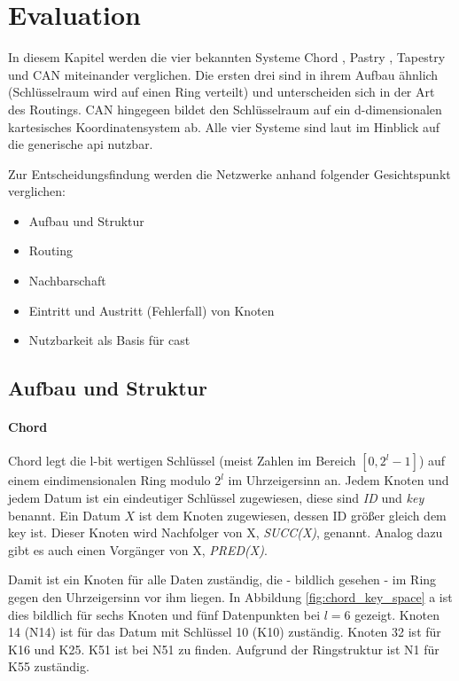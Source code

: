 


\section{Evaluation}
In diesem Kapitel werden die vier bekannten Systeme Chord \cite{Stoica2003}, Pastry \cite{Rowstron2001}, Tapestry \cite{Zhao2001Tapestry,Zhao2004Tapestry} und CAN \cite{Ratnasamy2001Scalable} miteinander verglichen. Die ersten drei sind in ihrem Aufbau ähnlich (Schlüsselraum wird auf einen Ring verteilt) und unterscheiden sich in der Art des Routings. CAN hingegeen bildet den Schlüsselraum auf ein d-dimensionalen kartesisches Koordinatensystem ab. Alle vier Systeme sind laut \cite{Dabek2003Towards} im Hinblick auf die generische \ac{api} nutzbar.

Zur Entscheidungsfindung werden die Netzwerke anhand folgender Gesichtspunkt verglichen:
\begin{itemize}
\item Aufbau und Struktur
\item Routing
\item Nachbarschaft
\item Eintritt und Austritt (Fehlerfall) von Knoten
\item Nutzbarkeit als Basis für \ac{cast}
\end{itemize}

\subsection{Aufbau und Struktur}
\paragraph{Chord}
Chord \cite{Stoica2003} legt die l-bit wertigen Schlüssel (meist Zahlen im Bereich $[0,2^l-1]$) auf einem eindimensionalen Ring modulo $2^l$ im Uhrzeigersinn an. Jedem Knoten und jedem Datum ist ein eindeutiger Schlüssel zugewiesen, diese sind \emph{ID} und \emph{key} benannt. Ein Datum $X$ ist dem Knoten zugewiesen, dessen ID größer gleich dem key ist. Dieser Knoten wird Nachfolger von X, \emph{SUCC(X)}, genannt. Analog dazu gibt es auch einen Vorgänger von X, \emph{PRED(X)}.

Damit ist ein Knoten für alle Daten zuständig, die - bildlich gesehen - im Ring gegen den Uhrzeigersinn vor ihm liegen. In Abbildung \ref{fig:chord_key_space} a ist dies bildlich für sechs Knoten und fünf Datenpunkten bei $l=6$ gezeigt. Knoten 14 (N14) ist für das Datum mit Schlüssel 10 (K10) zuständig. Knoten 32 ist für K16 und K25. K51 ist bei N51 zu finden. Aufgrund der Ringstruktur ist N1 für K55 zuständig.

